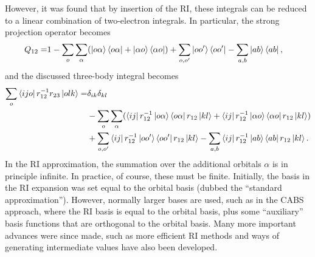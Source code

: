 However, it was found that by insertion of the \gls{RI},\supercite{kutzelniggR12DependentTermsWave1985,klopperMollerplesset1987,kutzelniggWave1991} these integrals can be reduced to a linear combination of two-electron integrals. In particular, the strong projection operator becomes
\begin{equation}
\begin{split}
    Q_{12} =& 1 - \sum_o\sum_\alpha (\ket{o\alpha}\bra{o\alpha} + \ket{\alpha o}\bra{\alpha o})
            + \sum_{o,o'}\ket{oo'}\bra{oo'} - \sum_{a,b}\ket{ab}\bra{ab},
\end{split}
\end{equation}
and the discussed three-body integral becomes
\begin{equation}
\begin{split}
    \sum_o\bra{ijo}r_{12}^{-1}r_{23}\ket{olk} =& \delta_{ik}\delta_{kl} \\
    &- \sum_{o}\sum_\alpha(\bra{ij}r_{12}^{-1}\ket{o\alpha}\bra{o\alpha}r_{12}\ket{kl} + \bra{ij}r_{12}^{-1}\ket{\alpha o}\bra{\alpha o}r_{12}\ket{kl}) \\
    &+ \sum_{o,o'}\bra{ij}r_{12}^{-1}\ket{oo'}\bra{oo'}r_{12}\ket{kl}
    - \sum_{a,b}\bra{ij}r_{12}^{-1}\ket{ab}\bra{ab}r_{12}\ket{kl}.
\end{split}
\end{equation}
In the \gls{RI} approximation, the summation over the additional orbitals $\alpha$ is in principle infinite. In practice, of course, these must be finite. Initially, the basis in the \gls{RI} expansion was set equal to the orbital basis (dubbed the ``standard approximation'').\supercite{kutzelniggR12DependentTermsWave1985,klopperOrbitalinvariant1991,klopperMollerplesset1987,klopperMP2R12,kutzelniggWave1991,termathWave1991,windSecondorder2002,valeevImproving2004,klopperWave1991} However, normally larger bases are used, such as in the \gls{CABS} approach, where the \gls{RI} basis is equal to the orbital basis, plus some ``auxiliary'' basis functions that are orthogonal to the orbital basis.\supercite{klopperExplicitly2002,valeevImproving2004} Many more important advances were since made, such as more efficient RI methods and ways of generating intermediate values have also been developed.\supercite{manbyDensity2003,wernerGeneral2007,ten-noDensity2003,kedzuchAlternative2005,shiozakiExplicitly2008,kohnImplementation2008,shiozakiHigherorder2009,wernerExplicitly2006,manbyExplicitly2006,wernerEliminating2008,petersonSystematically2008,yousafOptimized2008,yousafOptimized2009,ten-noInitiation2004,ten-noExplicitly2004,klopperExplicitly2002,ten-noNew2007,shiozakiEvaluation2009,mayExplicitly2004,adlerLocal2009,klopperHybrid2004}

